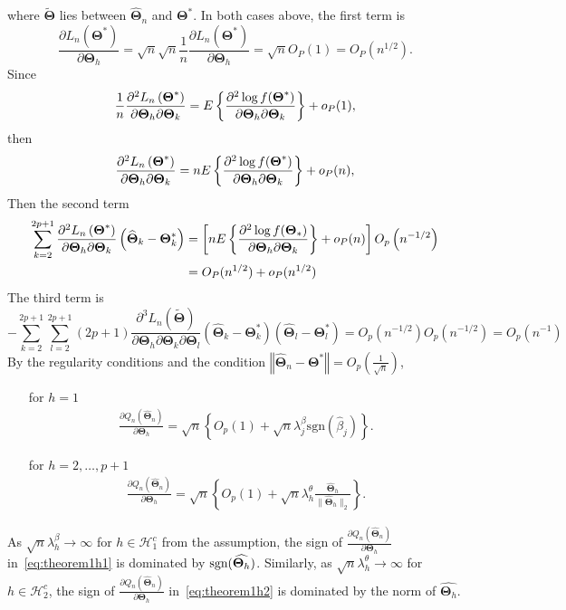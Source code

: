 \documentclass[12pt,letter]{article}\usepackage[]{graphicx}\usepackage[]{color}
\newcommand{\bTheta}{\boldsymbol{\Theta}}
\begin{document}
where $\widetilde{\bTheta}$ lies between $\widehat{\bTheta}_{n}$ and $\bTheta^{*}$. In both cases above, the first term is
\[
\frac{\partial L_{n}\left(\boldsymbol{\Theta}^{*}\right)}{\partial\bTheta_{h}}=\sqrt{n}\sqrt{n}\frac{1}{n}\frac{\partial L_{n}\left(\boldsymbol{\Theta}^{*}\right)}{\partial\bTheta_{h}}=\sqrt{n}O_{P}(1)=O_{P}(n^{1/2}).
\]
Since 
\[
\frac{1}{n}\frac{\partial^{2}L_{n}\left(\boldsymbol{\Theta}^{*}\right)}{\partial\bTheta_{h}\partial\bTheta_{k}}=E\left\{ \frac{\partial^{2}\log f(\bTheta^{*})}{\partial\bTheta_{h}\partial\bTheta_{k}}\right\} +\op(1),
\]
then
\[
\frac{\partial^{2}L_{n}\left(\boldsymbol{\Theta}^{*}\right)}{\partial\bTheta_{h}\partial\bTheta_{k}}=nE\left\{ \frac{\partial^{2}\log f(\bTheta^{*})}{\partial\bTheta_{h}\partial\bTheta_{k}}\right\} +\op(n),
\]
Then the second term
\begin{align*}
\sum_{k=2}^{2p+1}\frac{\partial^{2}L_{n}\left(\boldsymbol{\Theta}^{*}\right)}{\partial\bTheta_{h}\partial\bTheta_{k}}\left(\widehat{\bTheta}_{k}-\bTheta_{k}^{*}\right) & =\left[nE\left\{ \frac{\partial^{2}\log f(\bTheta_{*})}{\partial\bTheta_{h}\partial\bTheta_{k}}\right\} +\op(n)\right]O_{p}\left(n^{-1/2}\right)\\
& =O_{P}(n^{1/2})+o_{P}(n^{1/2})
\end{align*}
The third term is 
\[
-\sum_{k=2}^{2p+1}\sum_{l=2}^{2p+1}  (2p+1)\frac{\partial^{3}L_{n}(\widetilde{\bTheta})}{\partial\bTheta_{h}\partial\bTheta_{k}\partial\bTheta_{l}}\left(\widehat{\bTheta}_{k}-\bTheta_{k}^{*}\right)\left(\widehat{\bTheta}_{l}-\bTheta_{l}^{*}\right)=O_{p}\left(n^{-1/2}\right)O_{p}\left(n^{-1/2}\right)=O_{p}\left(n^{-1}\right)
\]
By the regularity conditions and the condition $\left\Vert \widehat{\boldsymbol{\Theta}}_{n}-\boldsymbol{\Theta}^{*}\right\Vert =O_{p}\left(\frac{1}{\sqrt{n}}\right)$,
\begin{itemize}
	\item[for] $h=1$  
	\begin{align}
	\frac{\partial Q_{n}\left(\widehat{\boldsymbol{\Theta}}_{n}\right)}{\partial\bTheta_{h}}=\sqrt{n}\left\{ O_{p}(1)+\sqrt{n}\lambda_{j}^{\beta}\textrm{sgn}\left(\hat{\beta}_{j}\right)\right\} . \label{eq:theorem1h1}
	\end{align}
	\item[for] $h=2, \ldots, p+1$ 
	\begin{align}
	\frac{\partial Q_{n}\left(\widehat{\boldsymbol{\Theta}}_{n}\right)}{\partial\bTheta_{h}}=\sqrt{n}\left\{ O_{p}(1)+\sqrt{n}\lambda_{h}^{\theta}\frac{\widehat{\bTheta}_{h}}{\|\widehat{\bTheta}_{h} \|_2}\right\} .\label{eq:theorem1h2}
	\end{align}
\end{itemize}
As $\sqrt{n}\lambda_h^\beta\to\infty$ for $h\in\mathcal{H}_{1}^{c}$ from the assumption, the sign of $\frac{\partial Q_{n}\left(\widehat{\boldsymbol{\Theta}}_{n}\right)}{\partial\bTheta_{h}}$ in~\eqref{eq:theorem1h1} is dominated by $\textrm{sgn(\ensuremath{\widehat{\bTheta_{h}})}}$. Similarly, as $\sqrt{n}\lambda_h^\theta\to\infty$ for $h\in\mathcal{H}_{2}^{c}$, the sign of $\frac{\partial Q_{n}\left(\widehat{\boldsymbol{\Theta}}_{n}\right)}{\partial\bTheta_{h}}$ in~\eqref{eq:theorem1h2} is dominated by the norm of $\widehat{\bTheta_{h}}$. 
\end{document}
